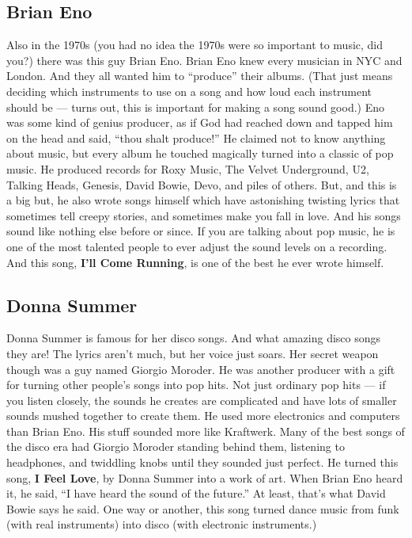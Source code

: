 \documentclass[letterpaper,]{article}
\begin{document}
\hypertarget{brian-eno}{%
\subsection{Brian Eno}\label{brian-eno}}

Also in the 1970s (you had no idea the 1970s were so important to music,
did you?) there was this guy Brian Eno. Brian Eno knew every musician in
NYC and London. And they all wanted him to ``produce'' their albums.
(That just means deciding which instruments to use on a song and how
loud each instrument should be --- turns out, this is important for
making a song sound good.) Eno was some kind of genius producer, as if
God had reached down and tapped him on the head and said, ``thou shalt
produce!'' He claimed not to know anything about music, but every album
he touched magically turned into a classic of pop music. He produced
records for Roxy Music, The Velvet Underground, U2, Talking Heads,
Genesis, David Bowie, Devo, and piles of others. But, and this is a big
but, he also wrote songs himself which have astonishing twisting lyrics
that sometimes tell creepy stories, and sometimes make you fall in love.
And his songs sound like nothing else before or since. If you are
talking about pop music, he is one of the most talented people to ever
adjust the sound levels on a recording. And this song, \textbf{I'll Come
Running}, is one of the best he ever wrote himself.

\hypertarget{donna-summer}{%
\subsection{Donna Summer}\label{donna-summer}}

Donna Summer is famous for her disco songs. And what amazing disco songs
they are! The lyrics aren't much, but her voice just soars. Her secret
weapon though was a guy named Giorgio Moroder. He was another producer
with a gift for turning other people's songs into pop hits. Not just
ordinary pop hits --- if you listen closely, the sounds he creates are
complicated and have lots of smaller sounds mushed together to create
them. He used more electronics and computers than Brian Eno. His stuff
sounded more like Kraftwerk. Many of the best songs of the disco era had
Giorgio Moroder standing behind them, listening to headphones, and
twiddling knobs until they sounded just perfect. He turned this song,
\textbf{I Feel Love}, by Donna Summer into a work of art. When Brian Eno
heard it, he said, ``I have heard the sound of the future.'' At least,
that's what David Bowie says he said. One way or another, this song
turned dance music from funk (with real instruments) into disco (with
electronic instruments.)
\end{document}
